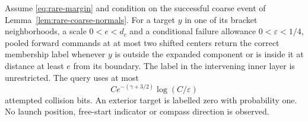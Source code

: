 \begin{proposition}
\label{prop:rare-query}
Assume \eqref{eq:rare-margin} and condition on the successful coarse
event of Lemma~\ref{lem:rare-coarse-normals}. For a target $y$ in one
of its bracket neighborhoods, a scale $0<e<d_c$ and a conditional failure
allowance $0<\varepsilon<1/4$, pooled forward commands at at most two
shifted centers return the correct membership label whenever $y$ is
outside the expanded component or is inside it at distance at least
$e$ from its boundary. The label in the intervening inner layer is
unrestricted. The query uses at most
\begin{equation}\label{eq:rare-query-cost}
                     C e^{-(\gamma+3/2)}\log(C/\varepsilon)
\end{equation}
attempted collision bits. An exterior target is labelled zero with
probability one. No launch position, free-start indicator or compass
direction is observed.
\end{proposition}
